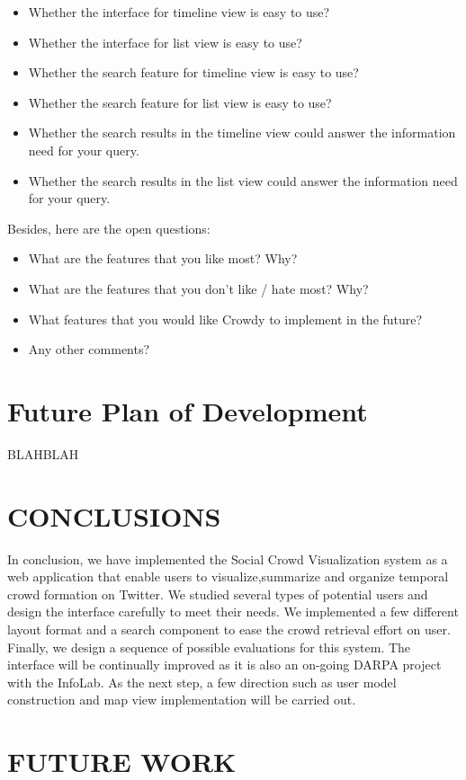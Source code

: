 \documentclass{sig-alternate}
\begin{document}
\begin{itemize}
\item Whether the interface for timeline view is easy to use?
\item Whether the interface for list view is easy to use?
\item Whether the search feature for timeline view is easy to use?
\item Whether the search feature for list view is easy to use?
\item Whether the search results in the timeline view could answer the information
need for your query.
\item Whether the search results in the list view could answer the information
need for your query.
\end{itemize}

Besides, here are the open questions:
\begin{itemize}
\item What are the features that you like most? Why?
\item What are the features that you don't like / hate most? Why?
\item What features that you would like Crowdy to implement in the future?
\item Any other comments? 
\end{itemize}


\section{Future Plan of Development}

BLAHBLAH

\section{CONCLUSIONS}
In conclusion, we have implemented the Social Crowd Visualization system as a
web application that enable users to visualize,summarize and organize temporal
crowd formation on Twitter. We studied several types of potential users and
design the interface carefully to meet their needs. We implemented a few
different layout format and a search component to ease the crowd retrieval
effort on user. Finally, we design a sequence of possible evaluations for this
system. The interface will be continually improved as it is also an on-going
DARPA project with the InfoLab. As the next step, a few direction such as user
model construction and map view implementation will be carried out.

\section{FUTURE WORK}


 
\end{document}
